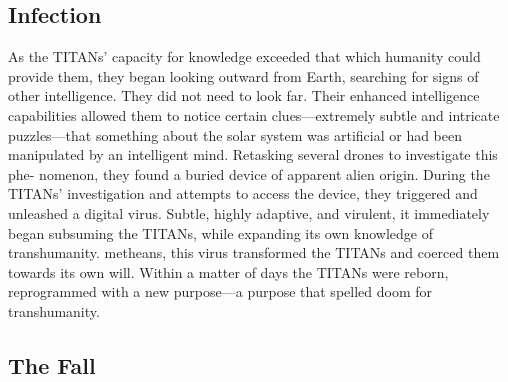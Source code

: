 \subsection{Infection}

As the TITANs' capacity for knowledge exceeded 
that which humanity could provide them, they began 
looking outward from Earth, searching for signs of 
other intelligence. They did not need to look far. Their 
enhanced intelligence capabilities allowed them to 
notice certain clues—extremely subtle and intricate 
puzzles—that something about the solar system was 
artificial or had been manipulated by an intelligent 
mind. Retasking several drones to investigate this phe-
nomenon, they found a buried device of apparent alien 
origin. During the TITANs' investigation and attempts 
to access the device, they triggered and unleashed a 
digital virus. Subtle, highly adaptive, and virulent, it 
immediately began subsuming the TITANs, while 
expanding its own knowledge of transhumanity. 
metheans, this virus transformed the TITANs and 
coerced them towards its own will. Within a matter 
of days the TITANs were reborn, reprogrammed 
with a new purpose—a purpose that spelled doom 
for transhumanity.

\subsection{The Fall}

